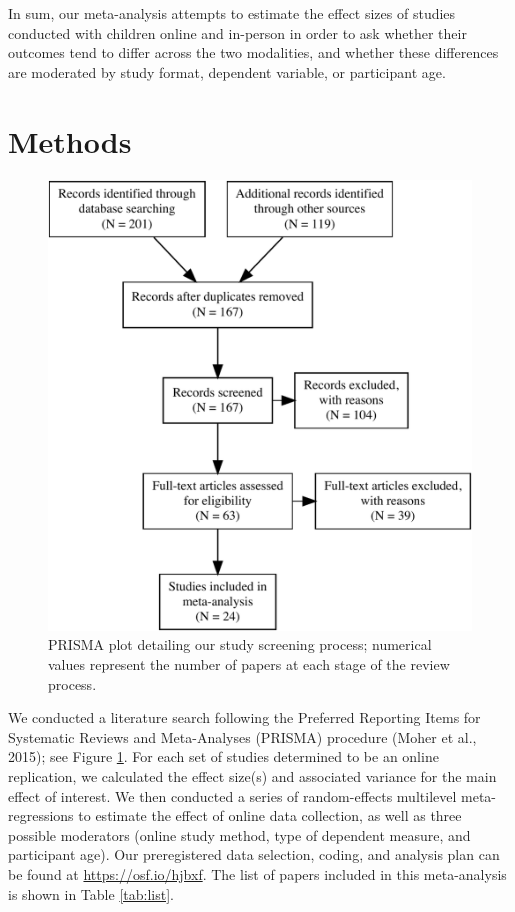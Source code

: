 \documentclass[
  man,floatsintext]{apa6}
\begin{document}
In sum, our meta-analysis attempts to estimate the effect sizes of studies conducted with children online and in-person in order to ask whether their outcomes tend to differ across the two modalities, and whether these differences are moderated by study format, dependent variable, or participant age.

\hypertarget{methods}{%
\section{Methods}\label{methods}}

\begin{figure}
\centering
\includegraphics{OnlineMA_main_files/figure-latex/prisma-1.pdf}
\caption{\label{fig:prisma}PRISMA plot detailing our study screening process; numerical values represent the number of papers at each stage of the review process.}
\end{figure}

We conducted a literature search following the Preferred Reporting Items for Systematic Reviews and Meta-Analyses (PRISMA) procedure (Moher et al., 2015); see Figure \ref{fig:prisma}. For each set of studies determined to be an online replication, we calculated the effect size(s) and associated variance for the main effect of interest. We then conducted a series of random-effects multilevel meta-regressions to estimate the effect of online data collection, as well as three possible moderators (online study method, type of dependent measure, and participant age). Our preregistered data selection, coding, and analysis plan can be found at \url{https://osf.io/hjbxf}. The list of papers included in this meta-analysis is shown in Table \ref{tab:list}.
\end{document}
